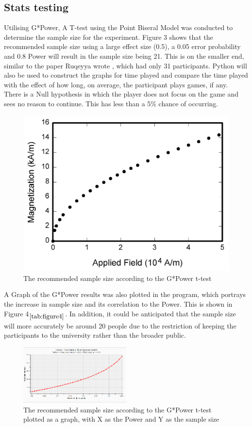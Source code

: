 \documentclass[conference]{IEEEtran}
\begin{document}
\subsection{Stats testing}
Utilising G*Power, A T-test using the Point Biseral Model was conducted to determine the sample size for the experiment. Figure 3 shows that the recommended sample size using a large effect size (0.5), a 0.05 error probability and 0.8 Power will result in the sample size being 21.  This is on the smaller end, similar to the paper Ruqeyya wrote \cite{Ruqeyya2022}, which had only 31 participants.  Python will also be used to construct the graphs for time played and compare the time played with the effect of how long, on average, the participant plays games, if any.\\

There is a Null hypothesis in which the player does not focus on the game and sees no reason to continue. This has less than a 5\% chance of occurring. 
\begin{figure}[H]
\includegraphics[width =0.5 \textwidth]{fig1}
\caption{The recommended sample size according to the G*Power t-test}
\label{figure4}
\end{figure}

A Graph of the G*Power results was also plotted in the program, which portrays the increase in sample size and its correlation to the Power. This is shown in Figure 4$_{\ref{tab:figure4}}$. In addition, it could be anticipated that the sample size will more accurately be around 20 people due to the restriction of keeping the participants to the university rather than the broader public. 

\begin{figure}[H]
\includegraphics[width = 0.5\textwidth]{fig2}
\caption{The recommended sample size according to the G*Power t-test plotted as a graph, with X as the Power and Y as the sample size}
\label{figure5}
\end{figure}
\end{document}
